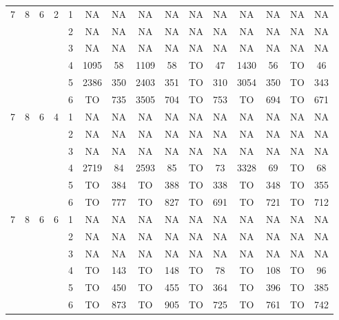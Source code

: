 \begin{longtable}{|c|c|c|c|c|c c|c c|c c|c c|c c|}
\hline
\multirow{6}{*}{7} & \multirow{6}{*}{8} & \multirow{6}{*}{6} & \multirow{6}{*}{2} & 1 & NA & NA & NA & NA & NA & NA & NA & NA & NA & NA \\
 & & & & 2 & NA & NA & NA & NA & NA & NA & NA & NA & NA & NA \\
 & & & & 3 & NA & NA & NA & NA & NA & NA & NA & NA & NA & NA \\
 & & & & 4 & 1095 & 58 & 1109 & 58 & TO & 47 & 1430 & 56 & TO & 46 \\
 & & & & 5 & 2386 & 350 & 2403 & 351 & TO & 310 & 3054 & 350 & TO & 343 \\
 & & & & 6 & TO & 735 & 3505 & 704 & TO & 753 & TO & 694 & TO & 671 \\
\hline
\multirow{6}{*}{7} & \multirow{6}{*}{8} & \multirow{6}{*}{6} & \multirow{6}{*}{4} & 1 & NA & NA & NA & NA & NA & NA & NA & NA & NA & NA \\
 & & & & 2 & NA & NA & NA & NA & NA & NA & NA & NA & NA & NA \\
 & & & & 3 & NA & NA & NA & NA & NA & NA & NA & NA & NA & NA \\
 & & & & 4 & 2719 & 84 & 2593 & 85 & TO & 73 & 3328 & 69 & TO & 68 \\
 & & & & 5 & TO & 384 & TO & 388 & TO & 338 & TO & 348 & TO & 355 \\
 & & & & 6 & TO & 777 & TO & 827 & TO & 691 & TO & 721 & TO & 712 \\
\hline
\multirow{6}{*}{7} & \multirow{6}{*}{8} & \multirow{6}{*}{6} & \multirow{6}{*}{6} & 1 & NA & NA & NA & NA & NA & NA & NA & NA & NA & NA \\
 & & & & 2 & NA & NA & NA & NA & NA & NA & NA & NA & NA & NA \\
 & & & & 3 & NA & NA & NA & NA & NA & NA & NA & NA & NA & NA \\
 & & & & 4 & TO & 143 & TO & 148 & TO & 78 & TO & 108 & TO & 96 \\
 & & & & 5 & TO & 450 & TO & 455 & TO & 364 & TO & 396 & TO & 385 \\
 & & & & 6 & TO & 873 & TO & 905 & TO & 725 & TO & 761 & TO & 742 \\
\hline
\end{longtable}